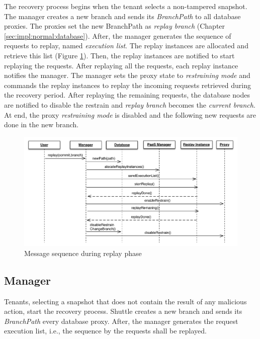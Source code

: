 The recovery process begins when the tenant selects a non-tampered snapshot. The manager creates a new branch and sends its \emph{BranchPath} to all database proxies. The proxies set the new BranchPath as \emph{replay branch} (Chapter \ref{sec:impl:normal:database}). After, the manager generates the sequence of requests to replay, named \emph{execution list}. The replay instances are allocated and retrieve this list (Figure \ref{fig:messaging_replay}). Then, the replay instances are notified to start replaying the requests. After replaying all the requests, each replay instance notifies the manager. The manager sets the proxy state to \emph{restraining mode} and commands the replay instances to replay the incoming requests retrieved during the recovery period. After replaying the remaining requests, the database nodes are notified to disable the restrain and \emph{replay branch} becomes the \emph{current branch}. At end, the proxy \emph{restraining mode} is disabled and the following new requests are done in the new branch.

\begin{figure}
  \centering
  \includegraphics[width=140mm]{images/message_replay}
  \caption{Message sequence during replay phase}
  \label{fig:messaging_replay}
\end{figure}


\subsection{Manager}\label{sec:impl:recovery:manager}
Tenants, selecting a snapshot that does not contain the result of any malicious action, start the recovery process. Shuttle creates a new branch and sends its \emph{BranchPath} every database proxy. After, the manager generates the request execution list, i.e., the sequence by the requests shall be replayed.

